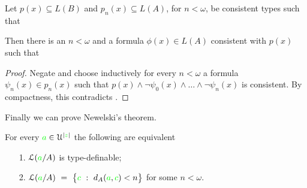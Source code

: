 \documentclass[creche.tex]{subfiles}
\begin{document}
\begin{lemma}\label{Baire}
Let $p(x)\subseteq L(B)$ and $p_n(x)\subseteq L(A)$, for $n<\omega$, be consistent types such that\smallskip


\noindent Then there is an $n<\omega$ and a formula $\phi(x)\in L(A)$ consistent with $p(x)$ such that \smallskip

\end{lemma}
\begin{proof}
Negate  and choose inductively for every $n<\omega$ a formula $\psi_n(x)\in p_n(x)$ such that $p(x)\wedge\neg\psi_0(x)\wedge\dots\wedge\neg\psi_n(x)$ is consistent. By compactness, this contradicts .
\end{proof}



Finally we can prove Newelski's theorem.


\begin{theorem}[(Newelski)]
For every ${\color{green} a}\in\EuScript U^{|{\color{green} z}|}$ the following are equivalent
\begin{itemize}
 \item[1.] $\EuScript L({\color{green} a}/A)$ is type-definable;
 \item[2.] $\EuScript L({\color{green} a}/A)\ =\ \big\{{\color{green} c}\ :\ d_A({\color{green} a},{\color{green} c})<n\big\}$ for some $n<\omega$.
\end{itemize}
\end{theorem}
\end{document}
